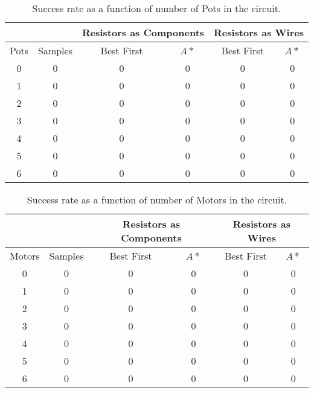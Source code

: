 \begin{table}[H]
\begin{center}
\begin{singlespace}
\begin{tabular}{| c | c || c | c | c | c |}
\hline
 & & \multicolumn{2}{|c|}{Resistors as Components} & \multicolumn{2}{|c|}{
 Resistors as Wires} \\
\hline
Pots & Samples & Best First & $A*$ & Best First & $A*$ \\
\hline\hline
0 & 0 & 0 & 0 & 0 & 0 \\
1 & 0 & 0 & 0 & 0 & 0 \\
2 & 0 & 0 & 0 & 0 & 0 \\
3 & 0 & 0 & 0 & 0 & 0 \\
4 & 0 & 0 & 0 & 0 & 0 \\
5 & 0 & 0 & 0 & 0 & 0 \\
6 & 0 & 0 & 0 & 0 & 0 \\
\hline
\end{tabular}
\end{singlespace}
\end{center}
\caption{Success rate as a function of number of Pots in the circuit.}
\end{table}

\begin{table}[H]
\begin{center}
\begin{singlespace}
\begin{tabular}{| c | c || c | c | c | c |}
\hline
 & & \multicolumn{2}{|c|}{Resistors as Components} & \multicolumn{2}{|c|}{
 Resistors as Wires} \\
\hline
Motors & Samples & Best First & $A*$ & Best First & $A*$ \\
\hline\hline
0 & 0 & 0 & 0 & 0 & 0 \\
1 & 0 & 0 & 0 & 0 & 0 \\
2 & 0 & 0 & 0 & 0 & 0 \\
3 & 0 & 0 & 0 & 0 & 0 \\
4 & 0 & 0 & 0 & 0 & 0 \\
5 & 0 & 0 & 0 & 0 & 0 \\
6 & 0 & 0 & 0 & 0 & 0 \\
\hline
\end{tabular}
\end{singlespace}
\end{center}
\caption{Success rate as a function of number of Motors in the circuit.}
\end{table}

